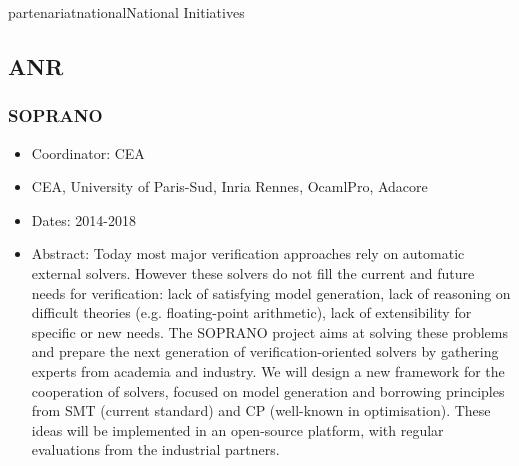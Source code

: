 \documentclass{ra2018}
\begin{document}
 \begin{module}{partenariat}{national}{National Initiatives}


 \subsection{ANR}


\subsubsection*{\label{project:soprano}SOPRANO}
\begin{itemize}
	\item Coordinator: CEA
	\item CEA, University of Paris-Sud, Inria Rennes, OcamlPro, Adacore
	\item Dates: 2014-2018
	\item Abstract:  Today most major verification
    approaches rely on automatic external
    solvers. However these solvers do not fill the current and
    future needs for verification: lack of satisfying model
    generation, lack of reasoning on difficult theories
    (e.g. floating-point arithmetic), lack of extensibility for
    specific or new needs. The SOPRANO
    project aims at solving these problems and prepare the next generation of verification-oriented
    solvers by gathering experts
    from academia and industry.
     We will design a new framework for the cooperation of
    solvers, focused on model generation and borrowing principles from
    SMT (current standard) and CP (well-known in optimisation).
    These ideas will be implemented in an open-source platform, with regular evaluations
    from the industrial partners.
\end{itemize}


\end{module}
\end{document}
